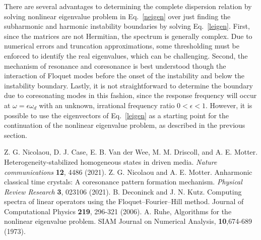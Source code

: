 \documentclass[aps,pre,amsmath,amssymb,floatfix,onecolumn,notitlepage,10pt]{revtex4-1}
\begin{document}
There are several advantages to determining the complete dispersion relation by solving nonlinear eigenvalue problem in Eq.~\eqref{neigen} over just finding the subharmonic and harmonic instability boundaries by solving Eq.~\eqref{leigen}. First, since the matrices are not Hermitian, the spectrum is generally complex. Due to numerical errors and truncation approximations, some thresholding must be enforced to identify the real eigenvalues, which can be challenging. Second, the mechanism of resonance and coresonance is best understood though the interaction of Floquet modes before the onset of the instability and below the instability boundary.  Lastly, it is not straightforward to determine the boundary due to coresonating modes in this fashion, since the response frequency will occur at $\omega = \epsilon \omega_d$ with an unknown, irrational frequency ratio $0<\epsilon<1$. However, it is possible to use the eigenvectors of Eq.~\eqref{leigen} as a starting point for the continuation of the nonlinear eigenvalue problem, as described in the previous section.



\begin{thebibliography}{99}
 Z. G. Nicolaou, D. J. Case, E. B. Van der Wee, M. M. Driscoll, and A. E. Motter. Heterogeneity-stabilized homogeneous states in driven media. \textit{Nature communications} \textbf{12}, 4486 (2021).
 Z. G. Nicolaou and A. E. Motter. Anharmonic classical time crystals: A coresonance pattern formation mechanism. \textit{Physical Review Research} \textbf{3}, 023106 (2021).
B. Deconinck and J. N. Kutz. Computing spectra of linear operators using the Floquet–Fourier–Hill method. Journal of Computational Physics \textbf{219}, 296-321 (2006).
 A. Ruhe, Algorithms for the nonlinear eigenvalue problem. SIAM Journal on Numerical Analysis, \textbf{10},674-689 (1973).
\end{thebibliography}
\end{document}
